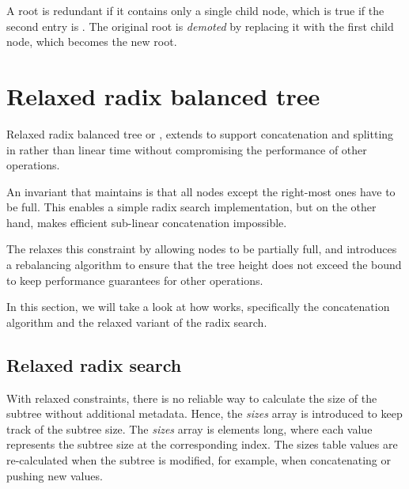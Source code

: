 A root is redundant if it contains only a single child node, which is true if the second entry is \nil{}.  The original root is \emph{demoted} by replacing it with the first child node, which becomes the new root.

\section{Relaxed radix balanced tree}


Relaxed radix balanced tree or \treerrb{}, extends \treerb{} to support concatenation and splitting in  rather than linear time without compromising the performance of other operations.

An invariant that \treerb{} maintains is that all nodes except the right-most ones have to be full. This enables a simple radix search implementation, but on the other hand, makes efficient sub-linear concatenation impossible.

The \treerrb{} relaxes this constraint by allowing nodes to be partially full, and introduces a rebalancing algorithm to ensure that the tree height does not exceed the  bound to keep performance guarantees for other operations.

In this section, we will take a look at how \treerrb{} works, specifically the concatenation algorithm and the relaxed variant of the radix search.

\subsection{Relaxed radix search}
With relaxed \treerrb{} constraints, there is no reliable way to calculate the size of the subtree without additional metadata. Hence, the \emph{sizes} array is introduced to keep track of the subtree size. The \emph{sizes} array is \m{} elements long, where each value represents the subtree size at the corresponding index. The sizes table values are re-calculated when the subtree is modified, for example, when concatenating or pushing new values.

